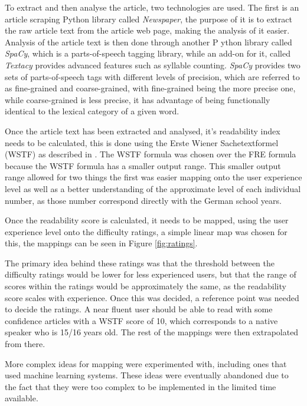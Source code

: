 To extract and then analyse the article, two technologies are used. The first is an article scraping Python library called \textit{Newspaper}, the purpose of it is to extract the raw article text from the article web page, making the analysis of it easier. Analysis of the article text is then done through another P ython library called \textit{SpaCy}, which is a parts-of-speech tagging library, while an add-on for it, called \textit{Textacy} provides advanced features such as syllable counting. \textit{SpaCy} provides two  sets of parts-of-speech tags with different levels of precision, which are referred to as fine-grained and coarse-grained, with fine-grained being the more precise one, while coarse-grained is less precise, it has advantage of being functionally identical to the lexical category of a given word.

Once the article text has been extracted and analysed, it's readability index needs to be calculated, this is done using the Erste Wiener Sachetextformel (WSTF) as described in \textcite{bamberger1984}. The WSTF formula was chosen over the FRE formula because the WSTF formula has a smaller output range. This smaller output range allowed for two things the first was easier mapping onto the user experience level as well as a better understanding of the approximate level of each individual number, as those number correspond directly with the German school years. 

Once the readability score is calculated, it needs to be mapped, using the user experience level onto the difficulty ratings, a simple linear map was chosen for this, the mappings can be seen in Figure \ref{fig:ratings}.



The primary idea behind these ratings was that the threshold between the difficulty ratings would be lower for less experienced users, but that the range of scores within the ratings would be approximately the same, as the readability score scales with experience. Once this was decided, a reference point was needed to decide the ratings. A near fluent user should be able to read with some confidence articles with a WSTF score of 10, which corresponds to a native speaker who is 15/16 years old. The rest of the mappings were then extrapolated from there. 

More complex ideas for mapping were experimented with, including ones that used machine learning systems. These ideas were eventually abandoned due to the fact that they were too complex to be implemented in the limited time available. 

